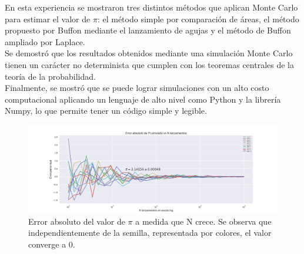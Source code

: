 \documentclass{rbf}
\begin{document}
En esta experiencia se mostraron tres distintos métodos que aplican Monte Carlo para estimar el valor de $\pi$: el método simple por comparación de áreas, el método propuesto por Buffon mediante el lanzamiento de agujas y el método de Buffon ampliado por Laplace. \\
Se demostró que los resultados obtenidos mediante una simulación Monte Carlo tienen un carácter no determinista que cumplen con los teoremas centrales de la teoría de la probabilidad. \\

Finalmente, se mostró que se puede lograr simulaciones con un alto costo computacional aplicando un lenguaje de alto nivel como Python y la librería Numpy, lo que permite tener un código simple y legible.

\newpage


\begin{figure}[tp]
  \includegraphics[scale=0.5]{figures/errors_uniforme.png}
	\caption{Error absoluto del valor de $\pi$ a medida que N crece. Se observa que independientemente de la semilla, representada por colores, el valor converge a 0.}
 \label{buff4}
\end{figure}



                                                                     
\end{document}
